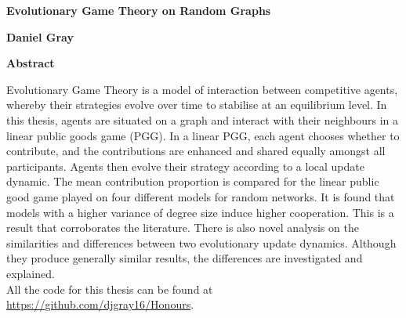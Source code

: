 \thispagestyle{plain}
\begin{center}
    \Large
    \textbf{Evolutionary Game Theory on Random Graphs}
    
    \vspace{0.4cm}
    \large
    
    
    \vspace{0.4cm}
    \textbf{Daniel Gray}
    
    \vspace{0.9cm}
    \textbf{Abstract}
\end{center}
Evolutionary Game Theory is a model of interaction between competitive agents, whereby their strategies evolve over time to stabilise at an equilibrium level. In this thesis, agents are situated on a graph and interact with their neighbours in a linear public goods game (PGG). In a linear PGG,  each agent  chooses whether to contribute, and the contributions are enhanced and shared equally amongst all participants. Agents then evolve their strategy according to a local update dynamic. The mean contribution proportion is compared for the linear public good game played on four different models for random networks. It is found that models with a higher variance of degree size induce higher cooperation. This is a result that corroborates the literature. There is also novel analysis on the similarities and differences between two evolutionary update dynamics. Although they produce generally similar results, the differences are investigated and explained. \\

All the code for this thesis can be found at \url{https://github.com/djgray16/Honours}. 